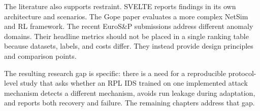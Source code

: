 The literature also supports restraint. SVELTE reports findings in its own architecture and scenarios. The Gope paper evaluates a more complex NetSim and RL framework. The recent EuroS\&P submissions address different anomaly domains. Their headline metrics should not be placed in a single ranking table because datasets, labels, and costs differ. They instead provide design principles and comparison points.

The resulting research gap is specific: there is a need for a reproducible protocol-level study that asks whether an RPL IDS trained on one implemented attack mechanism detects a different mechanism, avoids run leakage during adaptation, and reports both recovery and failure. The remaining chapters address that gap.
